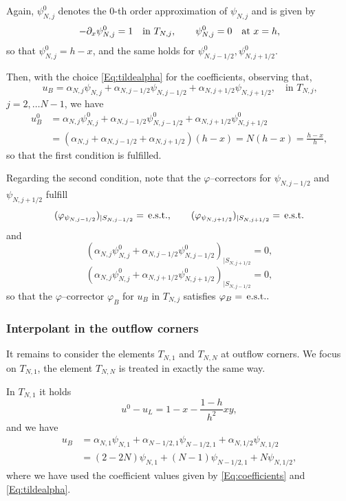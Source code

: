 \documentclass{article}
\newcommand{\est}{\text{\,e.s.t.}\xspace}
\begin{document}

Again, $\psi^0_{N,j}$ denotes the $0$-th order approximation of
$\psi_{N,j}$ and is given by 
\begin{equation*}
     - \partial_x \psi^0_{N,j} = 1   \quad\text{in } T_{N,j},\qquad
        \psi^0_{N,j} = 0 \text{\quad at $x=h$},
\end{equation*}
so that $\psi^0_{N,j} = h-x$,
and the same holds for $\psi_{N,j-1/2}^0,\psi_{N,j+1/2}^0$.

Then, with the choice \eqref{Eq:tildealpha} for the coefficients,
observing that, 
$$
u_B = \alpha_{N,j} \psi_{N,j} + \alpha_{N,j-1/2} \psi_{N,j-1/2}
    + \alpha_{N,j+1/2} \psi_{N,j+1/2},
    \quad\text{in $T_{N,j}$,}
$$
$j=2,\dots N-1$, we have
$$
\begin{aligned}
u_B^0 &= \alpha_{N,j} \psi_{N,j}^0 +\alpha_{N,j-1/2} \psi_{N,j-1/2}^0
    + \alpha_{N,j+1/2} \psi_{N,j+1/2}^0 \\
 & = (\alpha_{N,j}  + \alpha_{N,j-1/2} + \alpha_{N,j+1/2} )(h-x) =
             N(h-x) = \frac{h-x}{h},
\end{aligned}
$$
so that the first condition is fulfilled.


\bigskip
Regarding the second condition, note that the $\varphi$--correctors for 
$\psi_{N,j-1/2}$ and $\psi_{N,j+1/2}$ fulfill
$$
 (\varphi_{\psi_{N,j-1/2}} )_{|S_{N,j-1/2}} = \text{\est },\qquad
 (\varphi_{\psi_{N,j+1/2}} )_{|S_{N,j+1/2}} = \text{\est }
$$
and 
$$
(\alpha_{N,j} \psi_{N,j}^0 + \alpha_{N,j-1/2}\psi_{N,j-1/2}^0)_{|S_{N,j+1/2}} = 0,
$$
$$
(\alpha_{N,j} \psi_{N,j}^0 + \alpha_{N,j+1/2}\psi_{N,j+1/2}^0)_{|S_{N,j-1/2}} = 0,
$$
so that the $\varphi$--corrector $\varphi_B$ for $u_B$ in $T_{N,j}$ satisfies
$
\varphi_{B} = \est.
$

\subsubsection{Interpolant in the outflow corners}

It remains to consider the elements $T_{N,1}$ and $T_{N,N}$ at outflow corners.
We focus on  $T_{N,1}$, the element $T_{N,N}$ is treated in exactly the same way.

In $T_{N,1}$ it holds
$$
u^0 - u_L = 1-x - \frac{1-h}{h^2}xy,
$$
and we have
$$
\begin{aligned}
u_B &= \alpha_{N,1}\psi_{N,1} + \alpha_{N-1/2,1}\psi_{N-1/2,1} + \alpha_{N,1/2}\psi_{N,1/2} \\
 &= (2-2N)\psi_{N,1} + (N-1)\psi_{N-1/2,1} + N\psi_{N,1/2},
\end{aligned}
$$
where we have used the coefficient values given by \eqref{Eq:coefficients} and \eqref{Eq:tildealpha}.
\end{document}
